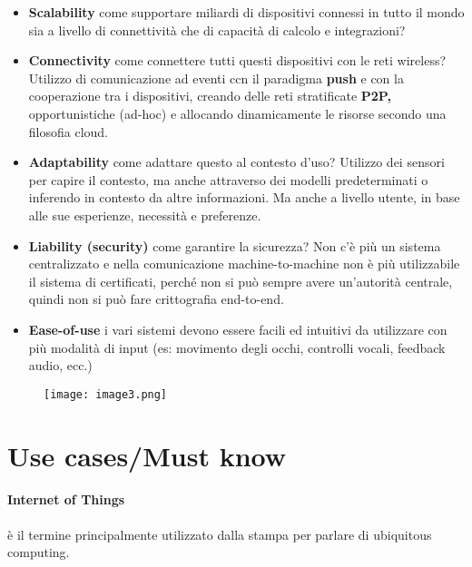 \begin{itemize}
\item \textbf{Scalability} come supportare miliardi di dispositivi connessi
  in tutto il mondo sia a livello di connettività che di
  capacità di calcolo e integrazioni?

\item \textbf{Connectivity} come connettere tutti questi dispositivi con le
  reti wireless? Utilizzo di comunicazione ad eventi ccn il paradigma
  \textbf{push} e con la cooperazione tra i dispositivi, creando delle
  reti stratificate \textbf{P2P,} opportunistiche (ad-hoc) e allocando
  dinamicamente le risorse secondo una filosofia cloud.

\item \textbf{Adaptability} come adattare questo al contesto d'uso? Utilizzo
  dei sensori per capire il contesto, ma anche attraverso dei modelli
  predeterminati o inferendo in contesto da altre informazioni. Ma anche
  a livello utente, in base alle sue esperienze, necessità e preferenze.

\item \textbf{Liability (security)} come garantire la sicurezza? Non c'è più
  un sistema centralizzato e nella comunicazione machine-to-machine non
  è più utilizzabile il sistema di certificati, perché non si può sempre
  avere un'autorità centrale, quindi non si può fare crittografia
  end-to-end.

\item \textbf{Ease-of-use} i vari sistemi devono essere facili ed intuitivi
  da utilizzare con più modalità di input (es: movimento degli occhi,
  controlli vocali, feedback audio, ecc.)

\end{itemize}

\begin{figure}[H]
 \centering
 \texttt{[image: image3.png]}
\end{figure}

\section{Use cases/Must know}
\label{use-casesmust-know}

\paragraph*{Internet of Things} è il termine principalmente utilizzato dalla
stampa per parlare di ubiquitous computing.

